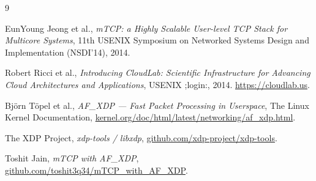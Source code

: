 \documentclass[10pt, letterpaper, twocolumn]{article}
\begin{document}
\begin{thebibliography}{9}

EunYoung Jeong et al.,
\textit{mTCP: a Highly Scalable User-level TCP Stack for Multicore Systems},
11th USENIX Symposium on Networked Systems Design and Implementation (NSDI'14), 2014.

Robert Ricci et al.,
\textit{Introducing CloudLab: Scientific Infrastructure for Advancing Cloud Architectures and Applications},
USENIX ;login:, 2014.
\href{https://cloudlab.us}{https://cloudlab.us}.

Bj\"orn T\"opel et al.,
\textit{AF\_XDP --- Fast Packet Processing in Userspace},
The Linux Kernel Documentation,
\href{https://www.kernel.org/doc/html/latest/networking/af_xdp.html}{kernel.org/doc/html/latest/networking/af\_xdp.html}.

The XDP Project,
\textit{xdp-tools / libxdp},
\href{https://github.com/xdp-project/xdp-tools}{github.com/xdp-project/xdp-tools}.

Toshit Jain,
\textit{mTCP with AF\_XDP},
\href{https://github.com/toshit3q34/mTCP_with_AF_XDP}{github.com/toshit3q34/mTCP\_with\_AF\_XDP}.

\end{thebibliography}
\end{document}
